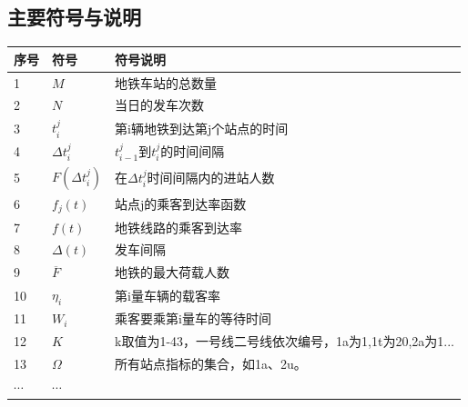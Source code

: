 \documentclass[12pt,a4paper]{mcmthesis}
\newcommand{\headcol}{\rowcolor{tableheadcolor}}
\begin{document}
    \subsection{主要符号与说明}

    \begin{table}[h!]
        \centering
        \small
        \begin{tabular}{p{60pt}<{\centering}|p{60pt}<{\centering}p{180pt}<{\raggedright}}
            \hline
            \headcol 序号 & 符号                  & 符号说明                                   \\
            \hline
            1           & $M$                 & 地铁车站的总数量                               \\
            2           & $N$                 & 当日的发车次数                                \\
            3           & $t_{i}^{j}$         & 第i辆地铁到达第j个站点的时间                        \\
            4           & $\Delta {t_i^j}$    & $t_{i-1}^{j}$到$t_i^j$的时间间隔             \\
            5           & $F(\Delta {t_i^j})$ & 在$\Delta t_i^j$时间间隔内的进站人数              \\
            6           & $f_j(t)$            & 站点j的乘客到达率函数                            \\
            7           & ${f(t)}$            & 地铁线路的乘客到达率                             \\
            8           & $\Delta(t)$         & 发车间隔                                   \\
            9           & $\overline{F}$      & 地铁的最大荷载人数                              \\
            10          & $\eta_i$            & 第i量车辆的载客率                              \\
            11          & $W_i$               & 乘客要乘第i量车的等待时间                          \\
            12          & $K$                 & k取值为1-43，一号线二号线依次编号，1a为1,1t为20,2a为1... \\
            13          & $\Omega$            & 所有站点指标的集合，如1a、2u。                      \\
            $\cdots$ & $\cdots$ \\
            \hline
        \end{tabular}
        \label{tab:symbol}
    \end{table}
\end{document}
